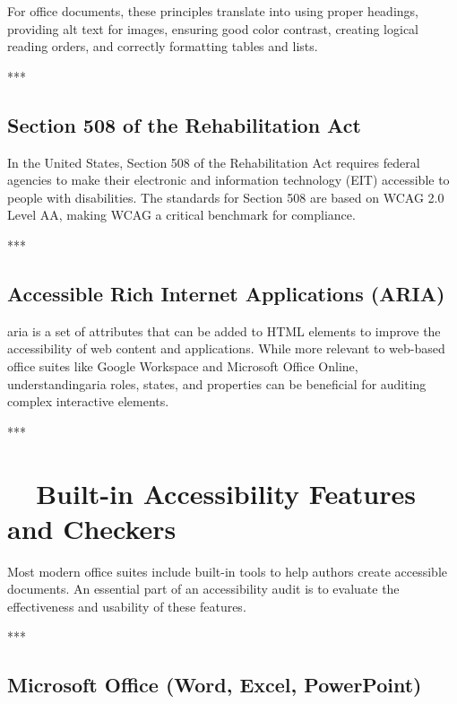 For office documents, these principles translate into using proper headings, providing alt text for images, ensuring good color contrast, creating logical reading orders, and correctly formatting tables and lists.

***

\subsection{Section 508 of the Rehabilitation Act}
\label{sub:section-508-of-the-rehabilitation-act}

In the United States, Section 508 of the Rehabilitation Act requires federal agencies to make their electronic and information technology (EIT) accessible to people with disabilities. The standards for Section 508 are based on WCAG 2.0 Level AA, making \gls{WCAG} a critical benchmark for compliance\supercite{Section508}.

***

\subsection{Accessible Rich Internet Applications (ARIA)}
\label{sub:accessible-rich-internet-applications-aria}

\gls{aria} is a set of attributes that can be added to HTML elements to improve the accessibility of web content and applications. While more relevant to web-based office suites like Google Workspace and Microsoft Office Online, understanding\gls{aria} roles, states, and properties can be beneficial for auditing complex interactive elements\supercite{w3caria}.

***

\section{~~Built-in Accessibility Features and Checkers}
\label{sec:built-in-accessibility-features-and-checkers}

Most modern office suites include built-in tools to help authors create accessible documents. An essential part of an accessibility audit is to evaluate the effectiveness and usability of these features.

***

\subsection{Microsoft Office (Word, Excel, PowerPoint)}
\label{sub:microsoft-office-word-excel-powerpoint}


